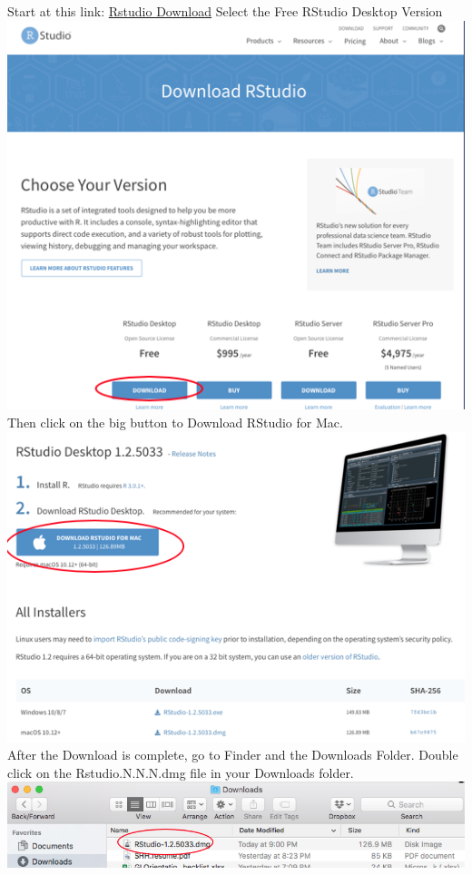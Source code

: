 \documentclass[
]{book}
\begin{document}
Start at this link: \href{https://rstudio.com/products/rstudio/download/}{Rstudio Download}
Select the Free RStudio Desktop Version
\includegraphics{images/rstudio_mac_download.png}
Then click on the big button to Download RStudio for Mac.
\includegraphics{images/rstudio_mac_download2.png}
After the Download is complete, go to Finder and the Downloads Folder. Double click on the Rstudio.N.N.N.dmg file in your Downloads folder.
\includegraphics{images/rstudio_mac_dmg.png}
\end{document}
